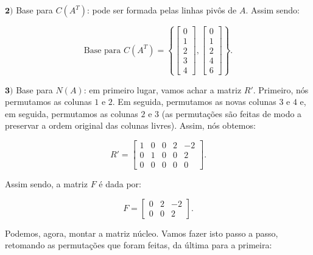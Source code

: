 \begin{Example}
	$\mathbf{2)}$ Base para $C(A^T)$: pode ser formada pelas linhas pivôs de $A$. Assim sendo:
	
	$$
	\text{Base para $C(A^T)$} = \left\{\begin{bmatrix}
		0 \\
		1 \\
		2 \\
		3 \\
		4
	\end{bmatrix}, \begin{bmatrix}
		0 \\
		1 \\
		2 \\
		4 \\
		6
	\end{bmatrix}\right\}.
	$$
	
	$\mathbf{3)}$ Base para $N(A)$: em primeiro lugar, vamos achar a matriz $R'$. Primeiro, nós permutamos as colunas $1$ e $2$. Em seguida, permutamos as novas colunas $3$ e $4$ e, em seguida, permutamos as colunas $2$ e $3$ (as permutações são feitas de modo a preservar a ordem original das colunas livres). Assim, nós obtemos:
	
	$$
	R' = \begin{bmatrix}
		1 & 0 & 0 & 2 & -2 \\
		0 & 1 & 0 & 0 & 2 \\
		0 & 0 & 0 & 0 & 0
	\end{bmatrix}.
	$$
	
	Assim sendo, a matriz $F$ é dada por:
	
	$$
	F = \begin{bmatrix}
		0 & 2 & -2 \\
		0 & 0 & 2
	\end{bmatrix}.
	$$
	
	Podemos, agora, montar a matriz núcleo. Vamos fazer isto passo a passo, retomando as permutações que foram feitas, da última para a primeira:
	

\end{Example}
